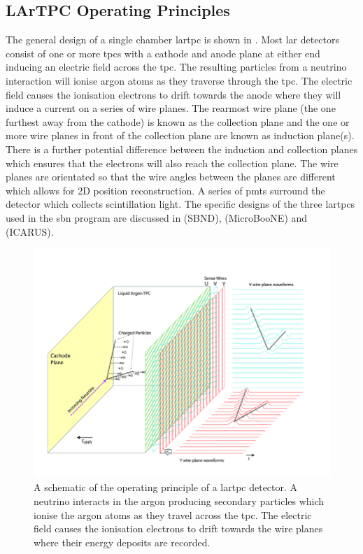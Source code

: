 \subsection{LArTPC Operating Principles}
The general design of a single chamber \gls{lartpc} is shown in . Most \gls{lar} detectors consist of one or more \glspl{tpc} with a cathode and anode plane at either end inducing an electric field across the \gls{tpc}. The resulting particles from a neutrino interaction will ionise argon atoms as they traverse through the \gls{tpc}. The electric field causes the ionisation electrons to drift towards the anode where they will induce a current on a series of wire planes. The rearmost wire plane (the one furthest away from the cathode) is known as the collection plane and the one or more wire planes in front of the collection plane are known as induction plane(s). There is a further potential difference between the induction and collection planes which ensures that the electrons will also reach the collection plane. The wire planes are orientated so that the wire angles between the planes are different which allows for 2D position reconstruction. A series of \glspl{pmt} surround the detector which collects scintillation light. The specific designs of the three \glspl{lartpc} used in the \gls{sbn} program are discussed in  (SBND),  (MicroBooNE) and  (ICARUS).

\begin{figure}[h]
    \centering
    \includegraphics[width =\hugefigwidth]{figures-chap3/Operational-principle-of-the-MicroBooNE-LArTPC.png}
    \caption[Schematic of LArTPC detector.]{A schematic of the operating principle of a \gls{lartpc} detector. A neutrino interacts in the argon producing secondary particles which ionise the argon atoms as they travel across the \gls{tpc}. The electric field causes the ionisation electrons to drift towards the wire planes where their energy deposits are recorded. \cite{Design_and_Construction_of_the_MicroBooNE_Detector}}
    \label{fig:lartpc}
\end{figure}

